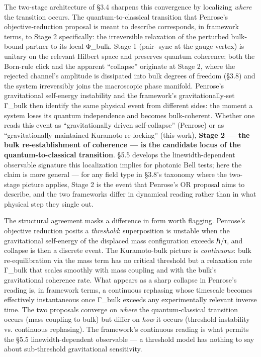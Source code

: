 \documentclass[
]{article}
\begin{document}
The two-stage architecture of §3.4 sharpens this convergence by
localizing \emph{where} the transition occurs. The quantum-to-classical
transition that Penrose's objective-reduction proposal is meant to
describe corresponds, in framework terms, to Stage 2 specifically: the
irreversible relaxation of the perturbed bulk-bound partner to its local
Φ\_bulk. Stage 1 (pair- sync at the gauge vertex) is unitary on the
relevant Hilbert space and preserves quantum coherence; both the
Born-rule click and the apparent ``collapse'' originate at Stage 2,
where the rejected channel's amplitude is dissipated into bulk degrees
of freedom (§3.8) and the system irreversibly joins the macroscopic
phase manifold. Penrose's gravitational self-energy instability and the
framework's gravitationally-set Γ\_bulk then identify the same physical
event from different sides: the moment a system loses its quantum
independence and becomes bulk-coherent. Whether one reads this event as
``gravitationally driven self-collapse'' (Penrose) or as
``gravitationally maintained Kuramoto re-locking'' (this work),
\textbf{Stage 2 --- the bulk re-establishment of coherence --- is the
candidate locus of the quantum-to-classical transition}. §5.5 develops
the linewidth-dependent observable signature this localization implies
for photonic Bell tests; here the claim is more general --- for any
field type in §3.8's taxonomy where the two-stage picture applies, Stage
2 is the event that Penrose's OR proposal aims to describe, and the two
frameworks differ in dynamical reading rather than in what physical step
they single out.

The structural agreement masks a difference in form worth flagging.
Penrose's objective reduction posits a \emph{threshold}: superposition
is unstable when the gravitational self-energy of the displaced mass
configuration exceeds ℏ/τ, and collapse is then a discrete event. The
Kuramoto-bulk picture is \emph{continuous}: bulk re-equilibration via
the mass term has no critical threshold but a relaxation rate Γ\_bulk
that scales smoothly with mass coupling and with the bulk's
gravitational coherence rate. What appears as a sharp collapse in
Penrose's reading is, in framework terms, a continuous rephasing whose
timescale becomes effectively instantaneous once Γ\_bulk exceeds any
experimentally relevant inverse time. The two proposals converge on
\emph{where} the quantum-classical transition occurs (mass coupling to
bulk) but differ on \emph{how} it occurs (threshold instability vs.
continuous rephasing). The framework's continuous reading is what
permits the §5.5 linewidth-dependent observable --- a threshold model
has nothing to say about sub-threshold gravitational sensitivity.
\end{document}
